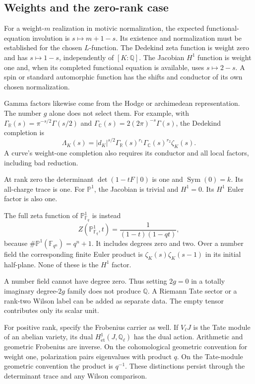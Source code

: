 \subsection{Weights and the zero-rank case}

For a weight-$m$ realization in motivic normalization, the expected
functional-equation involution is $s\mapsto m+1-s$. Its existence and
normalization must be established for the chosen $L$-function. The Dedekind
zeta function is weight zero and has $s\mapsto1-s$, independently of
$[K:\mathbb Q]$. The Jacobian $H^1$ function is weight one and, when its
completed functional equation is available, uses $s\mapsto2-s$. A spin or
standard automorphic function has the shifts and conductor of its own chosen
normalization.

Gamma factors likewise come from the Hodge or archimedean representation.
The number $g$ alone does not select them. For example, with
$\Gamma_{\mathbb R}(s)=\pi^{-s/2}\Gamma(s/2)$ and $\Gamma_{\mathbb
C}(s)=2(2\pi)^{-s}\Gamma(s)$, the Dedekind completion is
\[
 \Lambda_K(s)=|d_K|^{s/2}
       \Gamma_{\mathbb R}(s)^{r_1}
       \Gamma_{\mathbb C}(s)^{r_2}\zeta_K(s).
\]
A curve's weight-one completion also requires its conductor and all local
factors, including bad reduction.

At rank zero the determinant $\det(1-tF\mid0)$ is one and
$\operatorname{Sym}(0)=k$. Its all-charge trace is one. For $\mathbb P^1$,
the Jacobian is trivial and $H^1=0$. Its $H^1$ Euler factor is also one.

The full zeta function of $\mathbb P^1_{\mathbb F_q}$ is instead
\[
 Z(\mathbb P^1_{\mathbb F_q},t)
    =\frac1{(1-t)(1-qt)},
\]
because $\#\mathbb P^1(\mathbb F_{q^n})=q^n+1$. It includes degrees zero and
two. Over a number field the corresponding finite Euler product is
$\zeta_K(s)\zeta_K(s-1)$ in its initial half-plane. None of these is the
$H^1$ factor.

A number field cannot have degree zero. Thus setting $2g=0$ in a totally
imaginary degree-$2g$ family does not produce $\mathbb Q$. A Riemann Tate
sector or a rank-two Wilson label can be added as separate data. The empty
tensor contributes only its scalar unit.

For positive rank, specify the Frobenius carrier as well. If $V_\ell J$ is
the Tate module of an abelian variety, its dual $H^1_{\mathrm{\acute
et}}(J,\mathbb Q_\ell)$ has the dual action. Arithmetic and geometric
Frobenius are inverse. On the cohomological geometric convention for weight
one, polarization pairs eigenvalues with product $q$. On the Tate-module
geometric convention the product is $q^{-1}$. These distinctions persist
through the determinant trace and any Wilson comparison.

